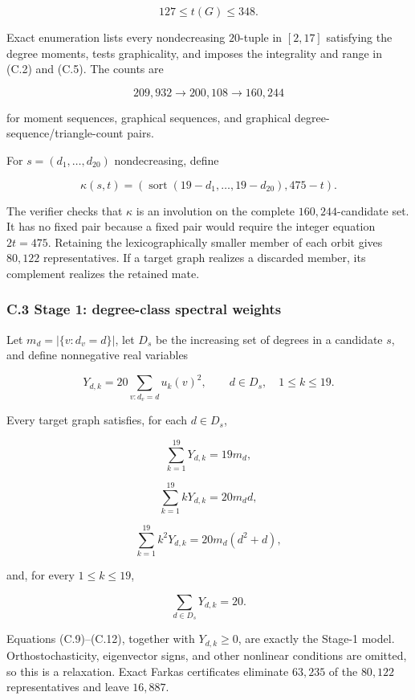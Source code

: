 \documentclass[
  english,
  11pt,
  a4paper,
]{article}
\begin{document}
\[
127\le t(G)\le348.
\tag{C.5}
\]

Exact enumeration lists every nondecreasing \(20\)-tuple in \([2,17]\)
satisfying the degree moments, tests graphicality, and imposes the
integrality and range in (C.2) and (C.5). The counts are

\[
209{,}932\longrightarrow200{,}108\longrightarrow160{,}244
\tag{C.6}
\]

for moment sequences, graphical sequences, and graphical
degree-sequence/triangle-count pairs.

For \(s=(d_1,\ldots,d_{20})\) nondecreasing, define

\[
\kappa(s,t)=
\left(\operatorname{sort}(19-d_1,\ldots,19-d_{20}),475-t\right).
\tag{C.7}
\]

The verifier checks that \(\kappa\) is an involution on the complete
\(160{,}244\)-candidate set. It has no fixed pair because a fixed pair
would require the integer equation \(2t=475\). Retaining the
lexicographically smaller member of each orbit gives \(80{,}122\)
representatives. If a target graph realizes a discarded member, its
complement realizes the retained mate.

\subsubsection{C.3 Stage 1: degree-class spectral
weights}\label{c.3-stage-1-degree-class-spectral-weights}

Let \(m_d=|\{v:d_v=d\}|\), let \(D_s\) be the increasing set of degrees
in a candidate \(s\), and define nonnegative real variables

\[
Y_{d,k}=20\sum_{v:d_v=d}u_k(v)^2,
\qquad d\in D_s,\quad1\le k\le19.
\tag{C.8}
\]

Every target graph satisfies, for each \(d\in D_s\),

\[
\sum_{k=1}^{19}Y_{d,k}=19m_d,
\tag{C.9}
\]

\[
\sum_{k=1}^{19}kY_{d,k}=20m_dd,
\tag{C.10}
\]

\[
\sum_{k=1}^{19}k^2Y_{d,k}=20m_d(d^2+d),
\tag{C.11}
\]

and, for every \(1\le k\le19\),

\[
\sum_{d\in D_s}Y_{d,k}=20.
\tag{C.12}
\]

Equations (C.9)--(C.12), together with \(Y_{d,k}\ge0\), are exactly the
Stage-1 model. Orthostochasticity, eigenvector signs, and other
nonlinear conditions are omitted, so this is a relaxation. Exact Farkas
certificates eliminate \(63{,}235\) of the \(80{,}122\) representatives
and leave \(16{,}887\).
\end{document}
